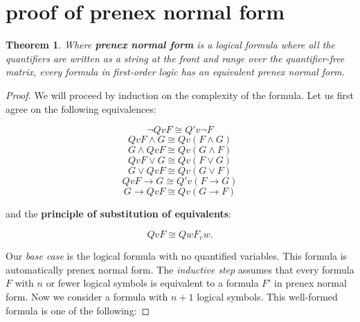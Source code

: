 \documentclass[a4paper,11pt]{article}
\newtheorem{thm}{Theorem}[section]
\begin{document}
\setcounter{equation}{0}

\pagebreak
	
	
\section{proof of prenex normal form}

\begin{thm} Where \textbf{prenex normal form} is a logical formula where all the quantifiers are written as a string at the front and range over the quantifier-free matrix, every formula in first-order logic has an equivalent prenex normal form. \end{thm}

	
	\begin{proof}
		We will proceed by induction on the complexity of the formula. 
		Let us first agree on the following equivalences:
		
		\begin{equation} \lnot Qv F \cong Q'v \lnot F \end{equation}
		\begin{equation} Qv F \land G \cong Qv(F \land G) \end{equation}
		\begin{equation} G \land Qv F \cong Qv(G \land F) \end{equation}	
		\begin{equation} Qv F \lor G \cong Qv(F \lor G) \end{equation}
		\begin{equation} G \lor Qv F \cong Qv(G \lor F) \end{equation}
		\begin{equation} Qv F  \rightarrow G \cong Q'v(F \rightarrow G) \end{equation}
		\begin{equation} G \rightarrow Qv F \cong Qv(G \rightarrow F) \end{equation}
		
		\bigskip
		
		and the \textbf{principle of substitution of equivalents}:
		
		\begin{equation} Qv F \cong Qw F_{v} w. \end{equation}
		
		\bigskip
		
		Our \textit{base case} is the logical formula with no quantified variables. This formula
		is automatically prenex normal form. The \textit{inductive step} assumes that every formula $F$
		with $n$ or fewer logical symbols is equivalent to a formula $F'$ in prenex normal form. 
		Now we consider a formula with $n + 1$ logical symbols. This well-formed formula is
		one of the following:
		

\end{proof}
\end{document}
